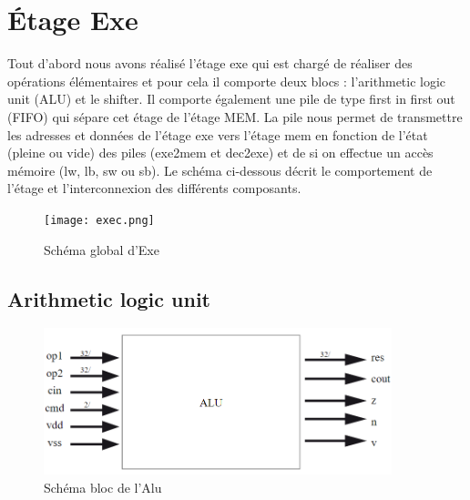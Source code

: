 \documentclass[10pt,a4paper]{article}
\begin{document}
	\section{Étage Exe}                      											%
	Tout d'abord nous avons réalisé l'étage exe qui est chargé de réaliser des opérations élémentaires et pour
	cela il comporte deux blocs : l'arithmetic logic unit (ALU) et le shifter. Il comporte également une pile de
	type first in first out (FIFO) qui sépare cet étage de l'étage MEM. La pile nous permet de transmettre les
	adresses et données de l'étage exe vers l'étage mem en fonction de l'état (pleine ou vide) des piles 
	(exe2mem et dec2exe) et de si on effectue un accès mémoire (lw, lb, sw ou sb). Le schéma ci-dessous décrit le
	comportement de l'étage et l'interconnexion des différents composants.
	
	\begin{figure}[H]																	%
		\centering 																		%
		\texttt{[image: exec.png]} 								%
		\caption{Schéma global d'Exe}															%
		\label{Fig.main2} 																%
	\end{figure}

		\subsection{Arithmetic logic unit}                    							%
		
			\begin{figure}[H]															%
				\centering 																%
				\includegraphics[width=0.9\textwidth]{alu.png} 							%
				\caption{Schéma bloc de l'Alu} 													%
				\label{Fig.main2} 														%
			\end{figure}
\end{document}
